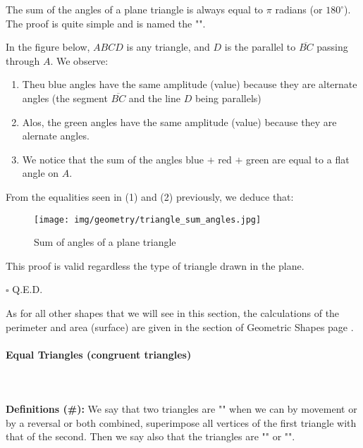	\begin{theorem}
	The sum of the angles of a plane triangle is always equal to $\pi$ radians (or $180^\circ$). The proof is quite simple and is named the "\label{angle sum theorem}".
	\end{theorem}
	\begin{dem}
	In the figure below, $ABCD$ is any triangle, and $D$ is the parallel to $\overline{BC}$ passing through $A$. We observe:
	\begin{enumerate}
		\item Theu blue angles have the same amplitude (value) because they are alternate angles (the segment $\overline{BC}$ and the line $D$ being parallels)

		\item Alos, the green angles have the same amplitude (value) because they are alernate angles.

		\item We notice that the sum of the angles blue $+$ red $+$ green are equal to a flat angle on $A$.
	\end{enumerate}
	From the equalities seen in (1) and (2) previously, we deduce that:
	
	\begin{figure}[H]
		\centering
		\texttt{[image: img/geometry/triangle\_sum\_angles.jpg]}
		\caption{Sum of angles of a plane triangle}
	\end{figure}
	This proof is valid regardless the type of triangle drawn in the plane.
	\begin{flushright}
		$\square$  Q.E.D.
	\end{flushright}
	\end{dem}
	As for all other shapes that we will see in this section, the calculations of the perimeter and area (surface) are given in the section of Geometric Shapes page \pageref{known surfaces}.
	
	\paragraph{Equal Triangles (congruent triangles)}\mbox{}\\\\
	\textbf{Definitions (\#\mydef):} We say that two triangles are "" when we can by movement or by a reversal or both combined, superimpose all vertices of the first triangle with that of the second. Then we say also that the triangles are "" or "".


